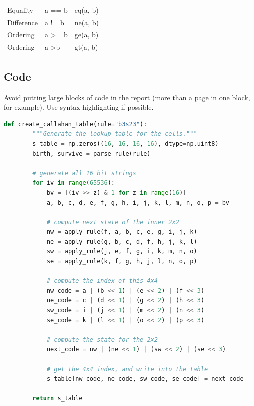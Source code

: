 \documentclass{l4proj}
\begin{document}
\begin{table}[]
\begin{tabular}{@{}lll@{}}
    Equality              & a == b                         & eq(a, b)                                     \\
    Difference            & a != b                         & ne(a, b)                                     \\
    Ordering              & a \textgreater{}= b            & ge(a, b)                                     \\
    Ordering              & a \textgreater b               & gt(a, b)                                     \\ 
    \end{tabular}
     \end{table}
\subsection{Code}

Avoid putting large blocks of code in the report (more than a page in one block, for example). Use syntax highlighting if possible.

\begin{lstlisting}[language=python]
    def create_callahan_table(rule="b3s23"):
        """Generate the lookup table for the cells."""        
        s_table = np.zeros((16, 16, 16, 16), dtype=np.uint8)
        birth, survive = parse_rule(rule)

        # generate all 16 bit strings
        for iv in range(65536):
            bv = [(iv >> z) & 1 for z in range(16)]
            a, b, c, d, e, f, g, h, i, j, k, l, m, n, o, p = bv

            # compute next state of the inner 2x2
            nw = apply_rule(f, a, b, c, e, g, i, j, k)
            ne = apply_rule(g, b, c, d, f, h, j, k, l)
            sw = apply_rule(j, e, f, g, i, k, m, n, o)
            se = apply_rule(k, f, g, h, j, l, n, o, p)

            # compute the index of this 4x4
            nw_code = a | (b << 1) | (e << 2) | (f << 3)
            ne_code = c | (d << 1) | (g << 2) | (h << 3)
            sw_code = i | (j << 1) | (m << 2) | (n << 3)
            se_code = k | (l << 1) | (o << 2) | (p << 3)

            # compute the state for the 2x2
            next_code = nw | (ne << 1) | (sw << 2) | (se << 3)

            # get the 4x4 index, and write into the table
            s_table[nw_code, ne_code, sw_code, se_code] = next_code

        return s_table

\end{lstlisting}
\end{document}
